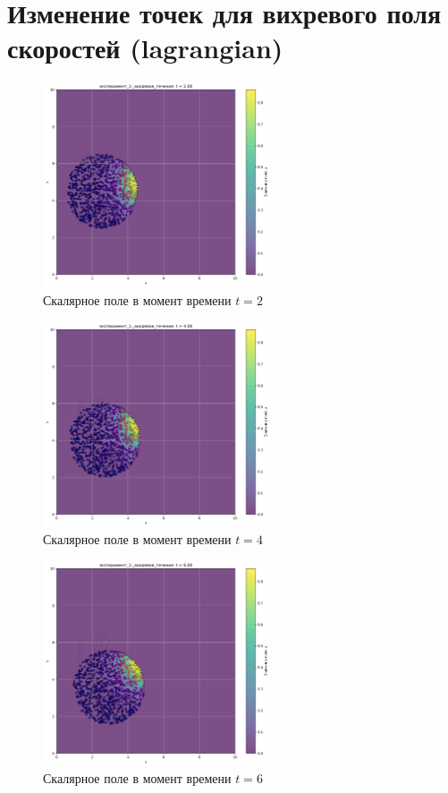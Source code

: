 \chapter{Изменение точек для вихревого поля скоростей (lagrangian)}
\label{app:vortex_lg}

\begin{figure}[h]
	\centering
	\includegraphics[width=0.6\textwidth]{imgs/lg/эксперимент_1:_вихревое_течение_t2.00.png}
	\caption{Скалярное поле в момент времени $t=2$ }
\end{figure}
\begin{figure}[h]
	\centering
	\includegraphics[width=0.6\textwidth]{imgs/lg/эксперимент_1:_вихревое_течение_t4.00.png}
	\caption{Скалярное поле в момент времени $t=4$ }
\end{figure}
\begin{figure}[h]
	\centering
	\includegraphics[width=0.6\textwidth]{imgs/lg/эксперимент_1:_вихревое_течение_t6.00.png}
	\caption{Скалярное поле в момент времени $t=6$ }
\end{figure}

